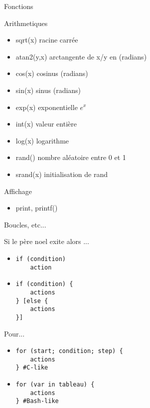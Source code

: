 \def\ftitle{Fonctions}
\begin{frame}[containsverbatim]{\ftitle}
\def\blocktitle{Arithmetiques}
\begin{block}{\blocktitle}
\begin{itemize}
\item sqrt(x) 	racine carrée
\item atan2(y,x)  	 arctangente de x/y en (radians)
\item cos(x) 	cosinus (radians)
\item sin(x) 	sinus (radians)
\item exp(x) 	exponentielle $e^{x}$
\item int(x) 	valeur entière
\item log(x) 	logarithme
\item rand() 	nombre aléatoire entre 0 et 1
\item srand(x) 	initialisation de rand
\end{itemize}
\end{block}

\def\blocktitle{Affichage}
\begin{block}{\blocktitle}
\begin{itemize}
\item print, printf()
\end{itemize}
\end{block}
\end{frame}

\def\ftitle{Boucles, etc...}
\begin{frame}[containsverbatim]{\ftitle}
\def\blocktitle{Si le père noel exite alors ...}
\begin{block}{\blocktitle}
\begin{itemize}
\item \begin{verbatim}
if (condition)
	action
\end{verbatim}
\item \begin{verbatim}
if (condition) {
	actions
} [else {
	actions
}]
\end{verbatim}
\end{itemize}
\end{block}
\def\blocktitle{Pour...}
\begin{block}{\blocktitle}
\begin{itemize}
\item \begin{verbatim}
for (start; condition; step) {
	actions
} #C-like
\end{verbatim}
\item \begin{verbatim}
for (var in tableau) {
	actions
} #Bash-like
\end{verbatim}
\end{itemize}
\end{block}
\end{frame}



